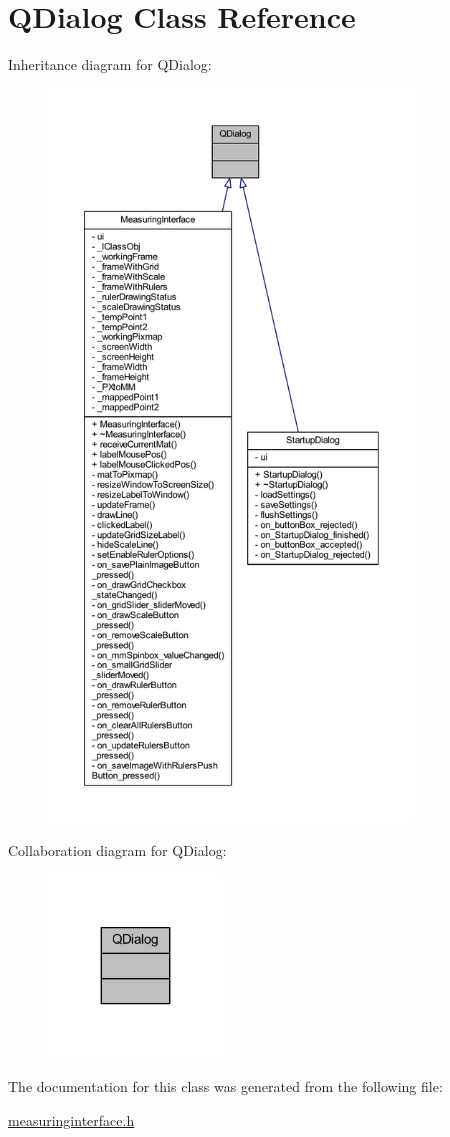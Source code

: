 \hypertarget{class_q_dialog}{}\section{Q\+Dialog Class Reference}
\label{class_q_dialog}


Inheritance diagram for Q\+Dialog\+:
\nopagebreak
\begin{figure}[H]
\begin{center}
\leavevmode
\includegraphics[height=550pt]{class_q_dialog__inherit__graph}
\end{center}
\end{figure}


Collaboration diagram for Q\+Dialog\+:\nopagebreak
\begin{figure}[H]
\begin{center}
\leavevmode
\includegraphics[width=131pt]{class_q_dialog__coll__graph}
\end{center}
\end{figure}


The documentation for this class was generated from the following file\+:\begin{DoxyCompactItemize}
\item 
\mbox{\hyperlink{measuringinterface_8h}{measuringinterface.\+h}}\end{DoxyCompactItemize}
